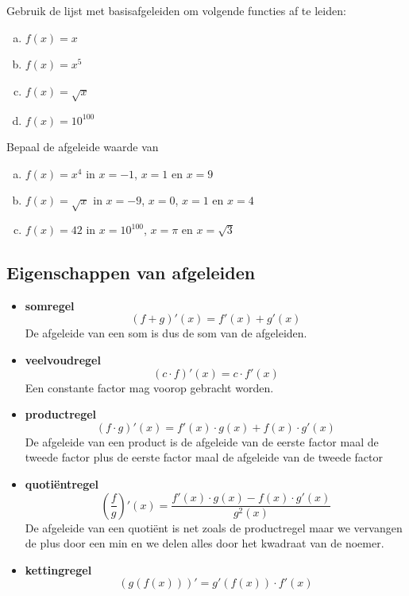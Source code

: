 \documentclass[a4paper,12pt,twoside]{article}
\newenvironment{kader}{
  \begin{mdframed}[nobreak=true]
  }{%
  \end{mdframed}
}
\begin{document}
\begin{oefening}
Gebruik de lijst met basisafgeleiden om volgende functies af te leiden:
\begin{enumerate}[(a)]
  \itemsep.5em
  \item $f(x)=x$
  \item $f(x)=x^5$
  \item $f(x)=\sqrt{x}$
  \item $f(x)=10^{100}$
\end{enumerate}
\end{oefening}

\begin{oefening}
Bepaal de afgeleide waarde van
\begin{enumerate}[(a)]
  \itemsep.5em
  \item $f(x)=x^4$ in $x=-1$, $x=1$ en $x=9$
  \item $f(x)=\sqrt{x}$ in $x=-9$, $x=0$, $x=1$ en $x=4$
  \item $f(x)=42$ in $x=10^{100}$, $x=\pi$ en $x=\sqrt{3}$
\end{enumerate}
\end{oefening}

\subsection{Eigenschappen van afgeleiden}

\begin{kader}
  \begin{itemize}
  \item {\bf somregel}
    $$(f+g)'(x)=f'(x)+g'(x)$$
    De afgeleide van een som is dus de som van de afgeleiden.
  \item {\bf veelvoudregel}
    $$(c\cdot f)'(x) = c\cdot f'(x)$$
    Een constante factor mag voorop gebracht worden.
  \item {\bf productregel}
    $$(f\cdot g)'(x)=f'(x)\cdot g(x) + f(x)\cdot g'(x)$$
    De afgeleide van een product is de afgeleide van de eerste factor maal de tweede factor plus de eerste factor maal de afgeleide van de tweede factor
  \item {\bf quotiëntregel}
    $$\left(\dfrac{f}{g}\right)'(x)=\dfrac{f'(x)\cdot g(x)-f(x)\cdot g'(x)}{g^2(x)}$$
    De afgeleide van een quotiënt is net zoals de productregel maar we vervangen de plus door een min en we delen alles door het kwadraat van de noemer.
  \item {\bf kettingregel}
    $$\left(g\left(f\left(x\right)\right)\right)'=g'(f(x))\cdot f'(x)$$
  \end{itemize}
\end{kader}
\end{document}
